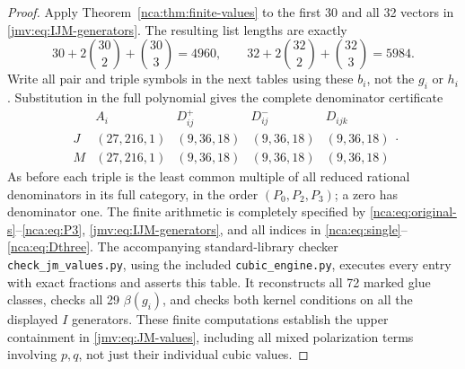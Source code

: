 \begin{proof}
Apply Theorem~\ref{nca:thm:finite-values} to the first 30 and
all 32 vectors in \eqref{jmv:eq:IJM-generators}. The resulting
list lengths are exactly
\[
 30+2\binom{30}{2}+\binom{30}{3}=4960,\qquad
 32+2\binom{32}{2}+\binom{32}{3}=5984.
\]
Write all pair and triple symbols in the next tables using these
\(b_i\), not the \(g_i\) or \(h_i\). Substitution in the full
polynomial gives the complete denominator certificate
\begin{equation}
\begin{array}{c|c|c|c|c}
 &A_i&D^+_{ij}&D^-_{ij}&D_{ijk}\\\hline
 J&(27,216,1)&(9,36,18)&(9,36,18)&(9,36,18)\\
 M&(27,216,1)&(9,36,18)&(9,36,18)&(9,36,18)
\end{array}.
\label{jmv:eq:JM-denominators}
\end{equation}
As before each triple is the least common multiple of all reduced
rational denominators in its full category, in the order
\((P_0,P_2,P_3)\); a zero has denominator one. The finite
arithmetic is completely specified by
\eqref{nca:eq:original-s}--\eqref{nca:eq:P3},
\eqref{jmv:eq:IJM-generators}, and all indices in
\eqref{nca:eq:single}--\eqref{nca:eq:Dthree}.
The accompanying standard-library checker
\texttt{check\_jm\_values.py}, using the included
\texttt{cubic\_engine.py}, executes every entry with exact
fractions and asserts this table. It reconstructs all 72 marked
glue classes, checks all 29 \(\beta(g_i)\), and checks both
kernel conditions on all the displayed \(I\) generators.
These finite computations establish the upper containment in
\eqref{jmv:eq:JM-values}, including all mixed polarization terms
involving \(p,q\), not just their individual cubic values.


\end{proof}
